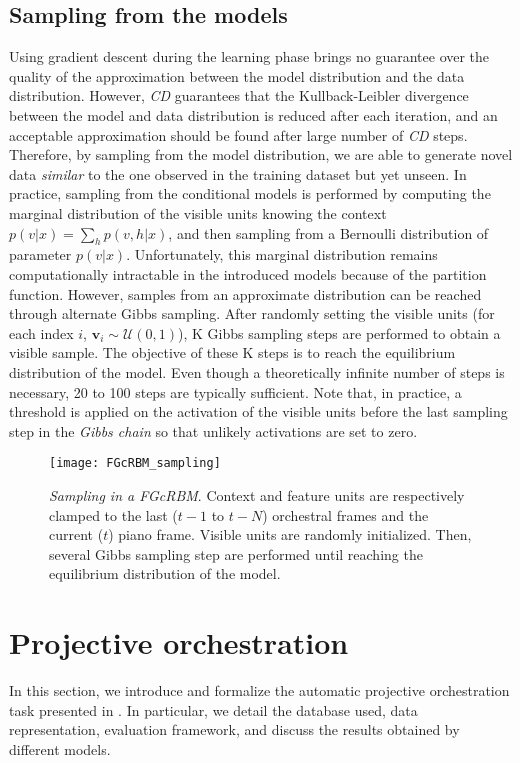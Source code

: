 \documentclass[letterpaper]{article}
\begin{document}
\subsection{Sampling from the models}
Using gradient descent during the learning phase brings no guarantee over the quality of the approximation between the model distribution and the data distribution.
However, \textit{CD} guarantees that the Kullback-Leibler divergence between the model and data distribution is reduced after each iteration\cite{hinton2002training}, and an acceptable approximation should be found after large number of \textit{CD} steps.
Therefore, by sampling from the model distribution, we are able to generate novel data \textit{similar} to the one observed in the training dataset but yet unseen. In practice, sampling from the conditional models is performed by computing the marginal distribution of the visible units knowing the context $p(v|x) = \sum_{h} p(v,h|x)$, and then sampling from a Bernoulli distribution of parameter $p(v|x)$.
Unfortunately, this marginal distribution remains computationally intractable in the introduced models because of the partition function. However, samples from an approximate distribution can be reached through alternate Gibbs sampling. After randomly setting the visible units (for each index $i$, $\bm{v}_{i} \sim \mathcal{U}(0,1)$), K Gibbs sampling steps are performed to obtain a visible sample. The objective of these K steps is to reach the equilibrium distribution of the model. Even though a theoretically  infinite number of steps is necessary, 20 to 100 steps are typically sufficient.
Note that, in practice, a threshold is applied on the activation of the visible units before the last sampling step in the \textit{Gibbs chain} so that unlikely activations are set to zero.

\begin{figure}
\centering
\texttt{[image: FGcRBM\_sampling]}
\caption{\textit{Sampling in a FGcRBM}. Context and feature units are respectively clamped to the last ($t-1$ to $t-N$) orchestral frames and the current ($t$) piano frame. Visible units are randomly initialized. Then, several Gibbs sampling step are performed until reaching the equilibrium distribution of the model.}
\label{fig:FGcRBM_sampling}
\end{figure}

\section{Projective orchestration}
In this section, we introduce and formalize the automatic projective orchestration task presented in . In particular, we detail the database used, data representation, evaluation framework, and discuss the results obtained by different models.
\end{document}
